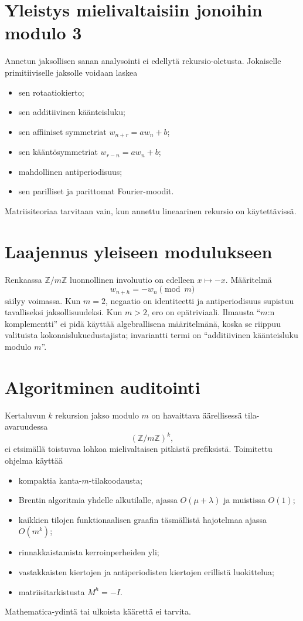 \documentclass[11pt,a4paper]{article}
\newcommand{\Z}{\mathbb{Z}}
\begin{document}
\section{Yleistys mielivaltaisiin jonoihin modulo 3}
Annetun jaksollisen sanan analysointi ei edellytä rekursio-oletusta. Jokaiselle primitiiviselle jaksolle voidaan laskea
\begin{itemize}
\item sen rotaatiokierto;
\item sen additiivinen käänteisluku;
\item sen affiiniset symmetriat $w_{n+r}=aw_n+b$;
\item sen kääntösymmetriat $w_{r-n}=aw_n+b$;
\item mahdollinen antiperiodisuus;
\item sen parilliset ja parittomat Fourier-moodit.
\end{itemize}
Matriisiteoriaa tarvitaan vain, kun annettu lineaarinen rekursio on käytettävissä.

\section{Laajennus yleiseen modulukseen}
Renkaassa $\Z/m\Z$ luonnollinen involuutio on edelleen $x\mapsto-x$. Määritelmä
\[
w_{n+h}=-w_n\pmod m
\]
säilyy voimassa. Kun $m=2$, negaatio on identiteetti ja antiperiodisuus supistuu tavalliseksi jaksollisuudeksi. Kun $m>2$, ero on epätriviaali. Ilmausta ``$m$:n komplementti'' ei pidä käyttää algebrallisena määritelmänä, koska se riippuu valituista kokonaislukuedustajista; invariantti termi on ``additiivinen käänteisluku modulo $m$''.

\clearpage
\section{Algoritminen auditointi}
Kertaluvun $k$ rekursion jakso modulo $m$ on havaittava äärellisessä tila-avaruudessa
\[
(\Z/m\Z)^k,
\]
ei etsimällä toistuvaa lohkoa mielivaltaisen pitkästä prefiksistä. Toimitettu ohjelma käyttää
\begin{itemize}
\item kompaktia kanta-$m$-tilakoodausta;
\item Brentin algoritmia yhdelle alkutilalle, ajassa $O(\mu+\lambda)$ ja muistissa $O(1)$;
\item kaikkien tilojen funktionaalisen graafin täsmällistä hajotelmaa ajassa $O(m^k)$;
\item rinnakkaistamista kerroinperheiden yli;
\item vastakkaisten kiertojen ja antiperiodisten kiertojen erillistä luokittelua;
\item matriisitarkistusta $M^h=-I$.
\end{itemize}
Mathematica-ydintä tai ulkoista käärettä ei tarvita.
\end{document}
